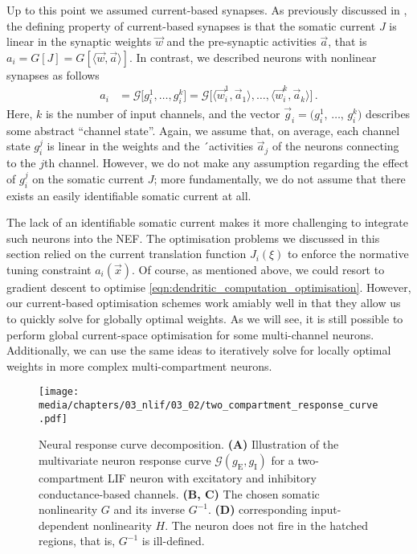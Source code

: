 Up to this point we assumed current-based synapses.
As previously discussed in , the defining property of current-based synapses is that the somatic current $J$ is linear in the synaptic weights $\vec w$ and the pre-synaptic activities $\vec a$, that is $a_i = G[J] = G[\langle \vec w, \vec a \rangle]$.
In contrast, we described neurons with nonlinear synapses as follows
\begin{align}
	a_i &=
	\mathscr{G} \bigl[
		g_i^1, \ldots, g_i^k
	\bigr] =
	\mathscr{G} \bigl[
		\langle \vec w_{i}^1, \vec a_1 \rangle,
		\ldots ,
		\langle \vec w_{i}^k, \vec a_k \rangle
	\bigr] \,.
	\label{eqn:def_response_curve_g}
\end{align}
Here, $k$ is the number of input channels, and the vector $\vec g_i = (g^1_i$, $\ldots$, $g^k_i)$ describes some abstract \enquote{channel state}.
Again, we assume that, on average, each channel state $g^j_i$ is linear in the weights and the ´activities $\vec a_j$ of the neurons connecting to the $j$th channel.
However, we do not make any assumption regarding the effect of $g^j_i$ on the somatic current $J$; more fundamentally, we do not assume that there exists an easily identifiable somatic current at all.

The lack of an identifiable somatic current makes it more challenging to integrate such neurons into the NEF.
The optimisation problems we discussed in this section relied on the current translation function $J_i(\xi)$ to enforce the normative tuning constraint $a_i(\vec x)$.
Of course, as mentioned above, we could resort to gradient descent to optimise \cref{eqn:dendritic_computation_optimisation}.
However, our current-based optimisation schemes work amiably well in that they allow us to quickly solve for globally optimal weights.
As we will see, it is still possible to perform global current-space optimisation for some multi-channel neurons.
Additionally, we can use the same ideas to iteratively solve for locally optimal weights in more complex multi-compartment neurons.

\begin{figure}
	\centering
	\texttt{[image: media/chapters/03\_nlif/03\_02/two\_compartment\_response\_curve.pdf]}
	\caption[Neural response curve decomposition]{Neural response curve decomposition. \textbf{(A)} Illustration of the multivariate neuron response curve $\mathscr{G}(g_\mathrm{E}, g_\mathrm{I})$ for a two-compartment LIF neuron with excitatory and inhibitory conductance-based channels. \textbf{(B, C)} The chosen somatic nonlinearity $G$ and its inverse $G^{-1}$. \textbf{(D)} corresponding input-dependent nonlinearity $H$. The neuron does not fire in the hatched regions, that is, $G^{-1}$ is ill-defined.} 
	\label{fig:two_compartment_response_curve}
\end{figure}

